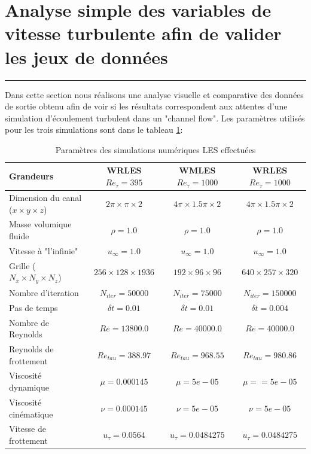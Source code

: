 \documentclass[12pt]{article}   %
\theoremstyle{plain}
\theoremstyle{remark}
\begin{document}
\vspace{0.3cm}
\section{Analyse simple des variables de vitesse turbulente afin de valider les jeux de données}
\noindent\rule{\linewidth}{2pt}
\vspace{0.1cm}

Dans cette section nous réalisons une analyse visuelle et comparative des données de sortie obtenu afin de voir si les résultats correspondent aux attentes d'une simulation d'écoulement turbulent dans un "channel flow". Les paramètres utilisés pour les trois simulations sont dans le tableau \ref{tab:parameters}: \\

\begin{table}[!h]
	\begin{tabular}{l | c | c | c}

		Grandeurs & WRLES $Re_{\tau}=395$ & WMLES $Re_{\tau}=1000$ & WRLES $Re_{\tau}=1000$\\ \hline \hline
		Dimension du canal ($x\times y \times z$) &  $2\pi\times\pi\times2$ & $4\pi\times1.5\pi\times2$ & $4\pi\times1.5\pi\times2$\\
		Masse volumique fluide &  $\rho = 1.0$ & $\rho = 1.0$ & $\rho = 1.0$ \\
		Vitesse à "l'infinie" & $u_{\infty}=1.0$ & $u_{\infty}=1.0$ & $u_{\infty}=1.0$  \\
		Grille ($N_x\times N_y \times N_z$) & $256\times128\times1936$ & $192\times96\times96$ & $640\times257\times320$ \\
		Nombre d'iteration & $N_{iter}=50000$ & $N_{iter}=75000$ & $N_{iter}=150000$ \\
		Pas de temps & $\delta t=0.01$ & $\delta t=0.01$ & $\delta t=0.004$ \\
		Nombre de Reynolds & $Re = 13800.0$ & $Re = 40000.0$ & $Re = 40000.0$ \\
		Reynolds de frottement & $Re_{tau} = 388.97$ & $Re_{tau} = 968.55$ & $Re_{tau} = 980.86$ \\
		Viscosité dynamique& $\mu = 0.000145$ & $\mu = 5e-05$ & $\mu = = 5e-05$ \\
		Viscosité cinématique & $\nu = 0.000145$ & $\nu = 5e-05$ & $\nu = 5e-05$ \\
		Vitesse de frottement & $u_{\tau} = 0.0564$ & $u_{\tau} = 0.0484275$ & $u_{\tau} = 0.0484275$ \\
		\hline
	\end{tabular}
	\caption{Paramètres des simulations numériques LES effectuées}
	\label{tab:parameters}
\end{table}
\end{document}
